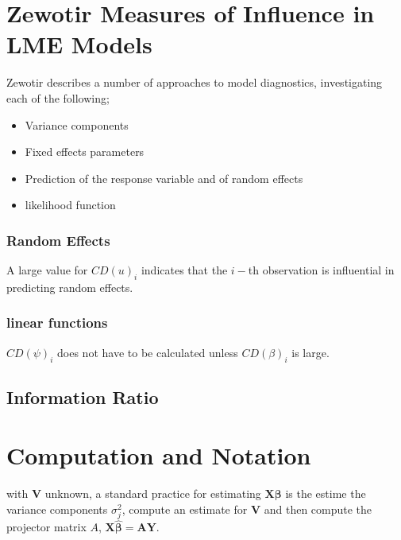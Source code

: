 \documentclass[Main.tex]{subfiles}
\begin{document}
	
	
	\section{Zewotir Measures of Influence in LME Models}%
	Zewotir describes a number of approaches to model diagnostics, investigating each of the following;
	\begin{itemize}
		\item Variance components
		\item Fixed effects parameters
		\item Prediction of the response variable and of random effects
		\item likelihood function
	\end{itemize}
	
	
	\newpage
	\subsubsection{Random Effects}
	
	A large value for $CD(u)_i$ indicates that the $i-$th observation is influential in predicting random effects.
	
	\subsubsection{linear functions}
	
	$CD(\psi)_i$ does not have to be calculated unless $CD(\beta)_i$ is large.
	
	
	\subsection{Information Ratio}
	
	
	\newpage
	\section{Computation and Notation } %
	with $\boldsymbol{V}$ unknown, a standard practice for estimating $\boldsymbol{X \beta}$ is the estime the variance components $\sigma^2_j$,
	compute an estimate for $\boldsymbol{V}$ and then compute the projector matrix $A$, $\boldsymbol{X \hat{\beta}}  = \boldsymbol{AY}$.
	
\end{document}
